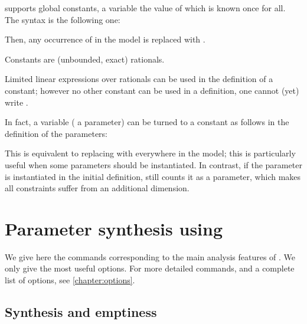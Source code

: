 \imitator{} supports global constants, \ie{} a variable the value of which is known once for all.
The syntax is the following one:
\begin{center}
\end{center}
Then, any occurrence of  in the model is replaced with .

Constants are (unbounded, exact) rationals.

Limited linear expressions over rationals can be used in the definition of a constant; however no other constant can be used in a definition, \ie{} one cannot (yet) write .


\begin{hint}
	In fact, a variable (\eg{} a parameter) can be turned to a constant as follows in the definition of the parameters:
	\begin{center}
	\end{center}
	This is equivalent to replacing  with  everywhere in the model; this is particularly useful when some parameters should be instantiated.
	In contrast, if the parameter is instantiated in the initial definition, \imitator{} still counts it as a parameter, which makes all constraints suffer from an additional dimension.
\end{hint}





\chapter{Parameter synthesis using \imitator{}}


We give here the commands corresponding to the main analysis features of \imitator{}.
We only give the most useful options.
For more detailed commands, and a complete list of options, see \cref{chapter:options}.

\section{Synthesis and emptiness}

